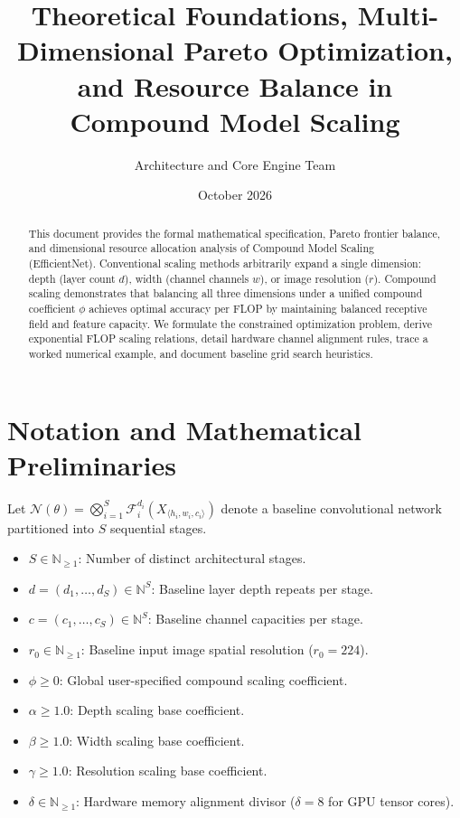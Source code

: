 \documentclass[11pt,a4paper]{article}
\title{\textbf{Theoretical Foundations, Multi-Dimensional Pareto Optimization, and Resource Balance in Compound Model Scaling}}
\author{Architecture and Core Engine Team}
\date{October 2026}
\theoremstyle{definition}
\begin{document}
\maketitle

\begin{abstract}
This document provides the formal mathematical specification, Pareto frontier balance, and dimensional resource allocation analysis of Compound Model Scaling (EfficientNet). Conventional scaling methods arbitrarily expand a single dimension: depth (layer count $d$), width (channel channels $w$), or image resolution ($r$). Compound scaling demonstrates that balancing all three dimensions under a unified compound coefficient $\phi$ achieves optimal accuracy per FLOP by maintaining balanced receptive field and feature capacity. We formulate the constrained optimization problem, derive exponential FLOP scaling relations, detail hardware channel alignment rules, trace a worked numerical example, and document baseline grid search heuristics.
\end{abstract}

\section{Notation and Mathematical Preliminaries}

Let $\mathcal{N}(\theta) = \bigotimes_{i=1}^S \mathcal{F}_i^{d_i}(X_{\langle h_i, w_i, c_i \rangle})$ denote a baseline convolutional network partitioned into $S$ sequential stages.

\begin{itemize}
    \item $S \in \mathbb{N}_{\ge 1}$: Number of distinct architectural stages.
    \item $d = (d_1, \dots, d_S) \in \mathbb{N}^S$: Baseline layer depth repeats per stage.
    \item $c = (c_1, \dots, c_S) \in \mathbb{N}^S$: Baseline channel capacities per stage.
    \item $r_0 \in \mathbb{N}_{\ge 1}$: Baseline input image spatial resolution ($r_0 = 224$).
    \item $\phi \ge 0$: Global user-specified compound scaling coefficient.
    \item $\alpha \ge 1.0$: Depth scaling base coefficient.
    \item $\beta \ge 1.0$: Width scaling base coefficient.
    \item $\gamma \ge 1.0$: Resolution scaling base coefficient.
    \item $\delta \in \mathbb{N}_{\ge 1}$: Hardware memory alignment divisor ($\delta = 8$ for GPU tensor cores).
\end{itemize}
\end{document}
